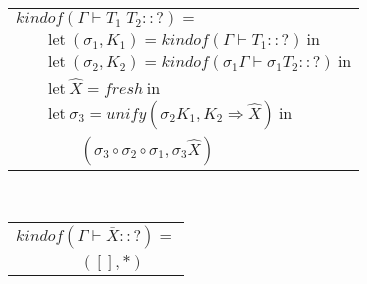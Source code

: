 \documentclass[11pt,leqno]{article}
\begin{document}
\begin{tabular}{l}
$kindof(\Gamma \vdash T_1 \; T_2 :: ?) = $ \\
$\qquad \textrm{let} \ (\sigma_1, K_1) = kindof(\Gamma \vdash T_1 :: ?) \ \textrm{in} $ \\
$\qquad \textrm{let} \ (\sigma_2, K_2) = kindof(\sigma_1 \Gamma \vdash \sigma_1 T_2 :: ?) \ \textrm{in} $ \\
$\qquad \textrm{let} \ \widehat{X} = fresh \ \textrm{in} $ \\
$\qquad \textrm{let} \ \sigma_3 = unify(\sigma_2 K_1, K_2 \Rightarrow \widehat{X}) \ \textrm{in} $ \\
$\qquad\qquad (\sigma_3 \circ \sigma_2 \circ \sigma_1, \sigma_3 \widehat{X}) $ \\
\end{tabular} \\
\begin{tabular}{l}
$kindof(\Gamma \vdash \bar{X} :: ?) = $ \\
$\qquad\qquad ([], *) $ \\
\end{tabular} \\
\end{document}

